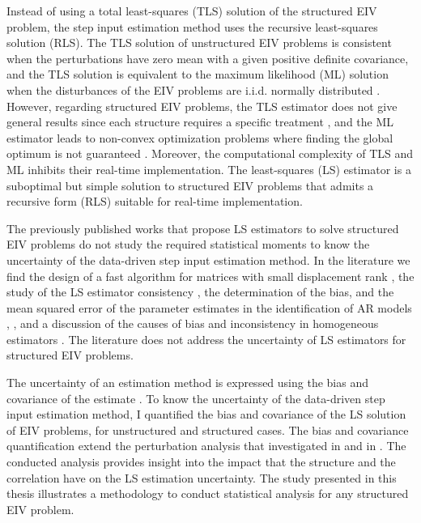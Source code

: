 Instead of using a total least-squares (TLS) solution of the structured EIV problem, the step input estimation method uses the recursive least-squares solution (RLS). 
The TLS solution of unstructured EIV problems is consistent when the perturbations have zero mean with a given positive definite covariance, and
the TLS solution is equivalent to the maximum likelihood (ML) solution when the disturbances of the EIV problems are i.i.d. normally distributed \citep{Markovsky07overview}. 
However, regarding structured EIV problems, the TLS estimator does not give general results since each structure requires a specific treatment \citep{VanHuffel07TLSeditorial}, and the ML estimator leads to non-convex optimization problems where finding the global optimum is not guaranteed \citep{Rhode14recursive}.
Moreover, the computational complexity of TLS and ML inhibits their real-time implementation.
The least-squares (LS) estimator is a suboptimal but simple solution to structured EIV problems that admits a recursive form (RLS) suitable for real-time implementation.

The previously published works that propose LS estimators to solve structured EIV problems do not study the required statistical moments to know the uncertainty of the data-driven step input estimation method.
In the literature we find 
the design of a fast algorithm for matrices with small displacement rank \citep{Mastronardi07fast}, 
the study of the LS estimator consistency \citep{Palanthandalam10parameter},
the determination of the bias, and the mean squared error of the parameter estimates in the identification of AR models \citep{Kiviet12high}, \citep{Kiviet14improved}, and
a discussion of the causes of bias and inconsistency in homogeneous estimators \citep{Yeredor04homogeneous}.
The literature does not address the uncertainty of LS estimators for structured EIV problems.

The uncertainty of an estimation method is expressed using the bias and covariance of the estimate \citep{Pintelon12Book}.
To know the uncertainty of the data-driven step input estimation method, I quantified the bias and covariance of the LS solution of EIV problems, for unstructured and structured cases. 
The bias and covariance quantification extend the perturbation analysis that investigated in \citep{Stewart90SPT} and in \citep{Vaccaro94}.
The conducted analysis provides insight into the impact that the structure and the correlation have on the LS estimation uncertainty.
The study presented in this thesis illustrates a methodology to conduct statistical analysis for any structured EIV problem.

